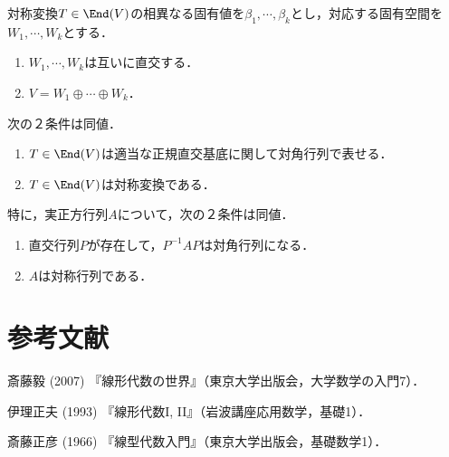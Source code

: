 \documentclass[uplatex, dvipdfmx]{jsreport}
\begin{document}
\begin{theorem}
    対称変換$T\in\End(V)$の相異なる固有値を$\beta_1,\cdots,\beta_k$とし，対応する固有空間を$W_1,\cdots,W_k$とする．
    \begin{enumerate}
        \item $W_1,\cdots,W_k$は互いに直交する．
        \item $V=W_1\oplus\cdots\oplus W_k$．
    \end{enumerate}
\end{theorem}

\begin{corollary}
    次の２条件は同値．
    \begin{enumerate}
        \item $T\in\End(V)$は適当な正規直交基底に関して対角行列で表せる．
        \item $T\in\End(V)$は対称変換である．
    \end{enumerate}
    特に，実正方行列$A$について，次の２条件は同値．
    \begin{enumerate}
        \item 直交行列$P$が存在して，$P^{-1}AP$は対角行列になる．
        \item $A$は対称行列である．
    \end{enumerate}
\end{corollary}

\chapter{参考文献}


\begin{thebibliography}{99}
    \item
    斎藤毅 (2007) 『線形代数の世界』（東京大学出版会，大学数学の入門7）．
    \item
    伊理正夫 (1993) 『線形代数I, II』（岩波講座応用数学，基礎1）．
    \item
    斎藤正彦 (1966) 『線型代数入門』（東京大学出版会，基礎数学1）．
\end{thebibliography}
\end{document}
